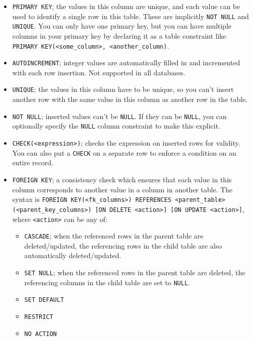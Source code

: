 \documentclass[table, xcdraw]{article}%
\begin{document}
\begin{itemize}
    \item \texttt{PRIMARY KEY}; the values in this column are unique, and each value can be used to identify a single row in this table. These are implicitly \texttt{NOT NULL} and \texttt{UNIQUE}. You can only have one primary key, but you can have multiple columns in your primary key by declaring it as a table constraint like \texttt{PRIMARY KEY(<some_column>, <another_column)}.
    \item \texttt{AUTOINCREMENT}; integer values are automatically filled in and incremented with each row insertion. Not supported in all databases.
    \item \texttt{UNIQUE}; the values in this column have to be unique, so you can't insert another row with the same value in this column as another row in the table.
    \item \texttt{NOT NULL}; inserted values can't be \texttt{NULL}. If they can be \texttt{NULL}, you can optionally specify the \texttt{NULL} column constraint to make this explicit.
    \item \texttt{CHECK(<expression>)}; checks the expression on inserted rows for validity. You can also put a \texttt{CHECK} on a separate row to enforce a condition on an entire record.
    \item \texttt{FOREIGN KEY}; a consistency check which ensures that each value in this column corresponds to another value in a column in another table. The syntax is \texttt{FOREIGN KEY(<fk_columns>) REFERENCES <parent_table>(<parent_key_columns>) [ON DELETE <action>] [ON UPDATE <action>]}, where \texttt{<action>} can be any of:
    \begin{itemize}
        \item \texttt{CASCADE}; when the referenced rows in the parent table are deleted/updated, the referencing rows in the child table are also automatically deleted/updated.
        \item \texttt{SET NULL}; when the referenced rows in the parent table are deleted, the referencing columns in the child table are set to \texttt{NULL}.
        \item \texttt{SET DEFAULT}
        \item \texttt{RESTRICT}
        \item \texttt{NO ACTION}
    \end{itemize}
\end{itemize}
\end{document}
